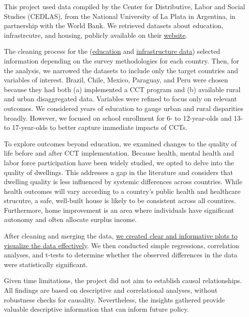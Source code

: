 \documentclass[
  10pt,
]{article}
\begin{document}
This project used data compiled by the Center for Distributive, Labor
and Social Studies (CEDLAS), from the National University of La Plata in
Argentina, in partnership with the World Bank. We retrieved datasets
about education, infrastrcutre, and housing, publicly available on their
\href{https://www.cedlas.econo.unlp.edu.ar/wp/en/estadisticas/sedlac/estadisticas/}{website}.

The cleaning process for the (\href{./cleaning_education.qmd}{education}
and \href{./cleaning_infraestructure.qmd}{infrastructure data}) selected
information depending on the survey methodologies for each country.
Then, for the analysis, we narrowed the datasets to include only the
target countries and variables of interest. Brazil, Chile, Mexico,
Paraguay, and Peru were chosen because they had both (a) implemented a
CCT program and (b) available rural and urban disaggregated data.
Variables were refined to focus only on relevant outcomes. We considered
years of education to gauge urban and rural disparities broadly.
However, we focused on school enrollment for 6- to 12-year-olds and 13-
to 17-year-olds to better capture immediate impacts of CCTs.

To explore outcomes beyond education, we examined changes to the quality
of life before and after CCT implementation. Because health, mental
health and labor force participation have been widely studied, we opted
to delve into the quality of dwellings. This addresses a gap in the
literature and considers that dwelling quality is less influenced by
systemic differences across countries. While health outcomes will vary
according to a country's public health and healthcare strucutre, a safe,
well-built house is likely to be consistent across all countires.
Furthermore, home improvement is an area where individuals have
significant autonomy and often allocate surplus income.

After cleaning and merging the data,
\href{./final_project_initial_analysis.qmd}{we created clear and
informative plots to visualize the data effectively}. We then conducted
simple regressions, correlation analyses, and t-tests to determine
whether the observed differences in the data were statistically
significant.

Given time limitations, the project did not aim to establish causal
relationships. All findings are based on descriptive and correlational
analyses, without robustness checks for causality. Nevertheless, the
insights gathered provide valuable descriptive information that can
inform future policy.
\end{document}
